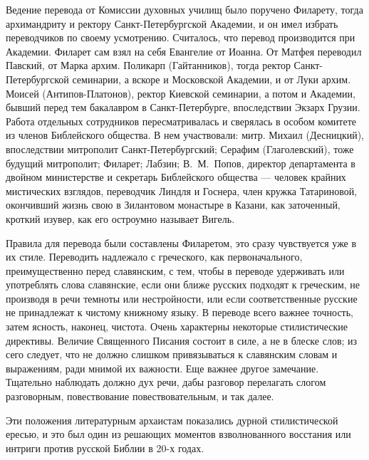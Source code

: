 Ведение перевода от Комиссии духовных училищ было поручено Филарету,
тогда архимандриту и ректору Санкт-Пе\-тер\-бургс\-кой Академии, и он имел
избрать переводчиков по своему усмотрению.
Считалось, что перевод производится при Академии.
Филарет сам взял на себя Евангелие от Иоанна.
От Матфея переводил Павский, от Марка архим. Поликарп (Гайтанников),
тогда ректор Санкт-Петербургской семинарии, а вскоре и Московской
Академии, и от Луки архим. Моисей (Антипов-Платонов), ректор Киевской
семинарии, а потом и Академии, бывший перед тем бакалавром в
Санкт-Петербурге, впоследствии Экзарх Грузии.
Работа отдельных сотрудников пересматривалась и сверялась в особом
комитете из членов Библейского общества.
В нем участвовали: митр. Михаил (Десницкий), впоследствии митрополит
Санкт-Петербургский;
Серафим (Глаголевский), тоже будущий митрополит;
Филарет;
Лабзин;
В.~М.~Попов, директор департамента в двойном министерстве и секретарь
Библейского общества --- человек крайних мистических взглядов, переводчик
Линдля и Госнера, член кружка Татариновой, окончивший жизнь свою в
Зилантовом монастыре в Казани, как заточенный, кроткий изувер, как
его остроумно называет Вигель.

Правила для перевода были составлены Филаретом, это сразу чувствуется
уже в их стиле.
Переводить надлежало с греческого, как первоначального, преимущественно
перед славянским, с тем, чтобы в переводе удерживать или употреблять
слова славянские, если они ближе русских подходят к греческим, не
производя в речи темноты или нестройности, или если соответственные
русские не принадлежат к чистому книжному языку.
В переводе всего важнее точность, затем ясность, наконец, чистота.
Очень характерны некоторые стилистические директивы.
Величие Священного Писания состоит в силе, а не в блеске слов; из сего
следует, что не должно слишком привязываться к славянским словам и выражениям,
ради мнимой их важности.
Еще важнее другое замечание.
Тщательно наблюдать должно дух речи, дабы разговор перелагать слогом
разговорным, повествование повествовательным, и так далее.

Эти положения литературным архаистам показались дурной стилистической
ересью, и это был один из решающих моментов взволнованного восстания
или интриги против русской Библии в 20-х годах.

